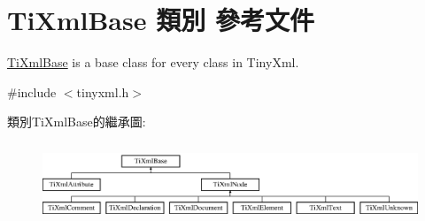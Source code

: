 \hypertarget{class_ti_xml_base}{}\section{Ti\+Xml\+Base 類別 參考文件}
\label{class_ti_xml_base}


\hyperlink{class_ti_xml_base}{Ti\+Xml\+Base} is a base class for every class in Tiny\+Xml.  




{\ttfamily \#include $<$tinyxml.\+h$>$}

類別\+Ti\+Xml\+Base的繼承圖\+:\begin{figure}[H]
\begin{center}
\leavevmode
\includegraphics[height=2.413793cm]{class_ti_xml_base}
\end{center}
\end{figure}
